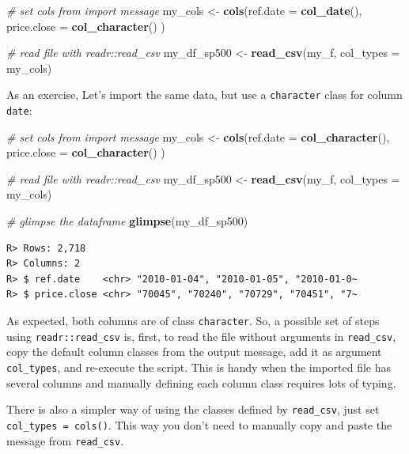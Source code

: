 \documentclass[
  12pt,
]{book}
\newenvironment{Shaded}{\begin{snugshade}}{\end{snugshade}}
\newcommand{\CommentTok}[1]{\textcolor[rgb]{0.37,0.37,0.37}{\textit{#1}}}
\newcommand{\DataTypeTok}[1]{\textcolor[rgb]{0.27,0.27,0.27}{#1}}
\newcommand{\KeywordTok}[1]{\textcolor[rgb]{0.27,0.27,0.27}{\textbf{#1}}}
\newcommand{\NormalTok}[1]{#1}
\newcommand{\StringTok}[1]{\textcolor[rgb]{0.5,0.5,0.5}{#1}}
\begin{document}
\begin{Shaded}
\begin{Highlighting}[]
\CommentTok{# set cols from import message}
\NormalTok{my_cols <-}\StringTok{ }\KeywordTok{cols}\NormalTok{(}\DataTypeTok{ref.date =} \KeywordTok{col_date}\NormalTok{(),}
                \DataTypeTok{price.close =} \KeywordTok{col_character}\NormalTok{() ) }

\CommentTok{# read file with readr::read_csv}
\NormalTok{my_df_sp500 <-}\StringTok{ }\KeywordTok{read_csv}\NormalTok{(my_f, }\DataTypeTok{col_types =}\NormalTok{ my_cols)}
\end{Highlighting}
\end{Shaded}

As an exercise, Let's import the same data, but use a \texttt{character} class for column \texttt{date}:

\begin{Shaded}
\begin{Highlighting}[]
\CommentTok{# set cols from import message}
\NormalTok{my_cols <-}\StringTok{ }\KeywordTok{cols}\NormalTok{(}\DataTypeTok{ref.date =} \KeywordTok{col_character}\NormalTok{(),}
                \DataTypeTok{price.close =} \KeywordTok{col_character}\NormalTok{() ) }

\CommentTok{# read file with readr::read_csv}
\NormalTok{my_df_sp500 <-}\StringTok{ }\KeywordTok{read_csv}\NormalTok{(my_f, }\DataTypeTok{col_types =}\NormalTok{ my_cols)}

\CommentTok{# glimpse the dataframe}
\KeywordTok{glimpse}\NormalTok{(my_df_sp500)}
\end{Highlighting}
\end{Shaded}

\begin{verbatim}
R> Rows: 2,718
R> Columns: 2
R> $ ref.date    <chr> "2010-01-04", "2010-01-05", "2010-01-0~
R> $ price.close <chr> "70045", "70240", "70729", "70451", "7~
\end{verbatim}

As expected, both columns are of class \texttt{character}. So, a possible set of steps using \texttt{readr::read\_csv} is, first, to read the file without arguments in \texttt{read\_csv}, copy the default column classes from the output message, add it as argument \texttt{col\_types}, and re-execute the script. This is handy when the imported file has several columns and manually defining each column class requires lots of typing.

There is also a simpler way of using the classes defined by \texttt{read\_csv}, just set \texttt{col\_types\ =\ cols()}. This way you don't need to manually copy and paste the message from \texttt{read\_csv}.
\end{document}
